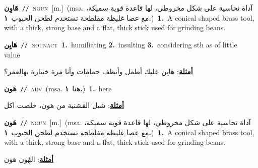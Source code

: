 \documentclass[10pt,a4paper,twoside]{article} %
\begin{document}
\begin{multicols}{2}
{\setlength\topsep{0pt}\textbf{\foreignlanguage{arabic}{هَاوِن}}\ {\color{gray}\texttt{//}\color{black}}\ \textsc{noun}\ [m.]\ \color{gray}(msa. \foreignlanguage{arabic}{آداة نحاسية على شكل مخروطي، لها قاعدة قوية سميكة، مع عصا غليظة مفلطحة تستخدم لطحن الحبوب}~\foreignlanguage{arabic}{\textbf{١.}})\color{black}\ \textbf{1.}~A conical shaped brass tool, with a thick, strong base and a flat, thick stick used for grinding beans.\ } \vspace{2mm}

{\setlength\topsep{0pt}\textbf{\foreignlanguage{arabic}{هَايِن}}\ {\color{gray}\texttt{//}\color{black}}\ \textsc{noun\textunderscore act}\ \textbf{1.}~humiliating  \textbf{2.}~insulting  \textbf{3.}~considering sth as of little value\  \begin{flushright}\color{gray}\foreignlanguage{arabic}{\textbf{\underline{\foreignlanguage{arabic}{أمثلة}}}: هايِن عليك أطمل وأنظف حمامات وأنا مرة ختيارة بهالعمر؟}\end{flushright}\color{black}} \vspace{2mm}

{\setlength\topsep{0pt}\textbf{\foreignlanguage{arabic}{هَون}}\ {\color{gray}\texttt{//}\color{black}}\ \textsc{adv}\ \color{gray}(msa. \foreignlanguage{arabic}{هنا}~\foreignlanguage{arabic}{\textbf{١.}})\color{black}\ \textbf{1.}~here\  \begin{flushright}\color{gray}\foreignlanguage{arabic}{\textbf{\underline{\foreignlanguage{arabic}{أمثلة}}}: شيل القشنية من هون، خلصت اكل}\end{flushright}\color{black}} \vspace{2mm}

{\setlength\topsep{0pt}\textbf{\foreignlanguage{arabic}{هَون}}\ {\color{gray}\texttt{//}\color{black}}\ \textsc{noun}\ [m.]\ \color{gray}(msa. \foreignlanguage{arabic}{آداة نحاسية على شكل مخروطي، لها قاعدة قوية سميكة، مع عصا غليظة مفلطحة تستخدم لطحن الحبوب}~\foreignlanguage{arabic}{\textbf{١.}})\color{black}\ \textbf{1.}~A conical shaped brass tool, with a thick, strong base and a flat, thick stick used for grinding beans.\  \begin{flushright}\color{gray}\foreignlanguage{arabic}{\textbf{\underline{\foreignlanguage{arabic}{أمثلة}}}: الهُون هون}\end{flushright}\color{black}} \vspace{2mm}


\end{multicols}
\end{document}
